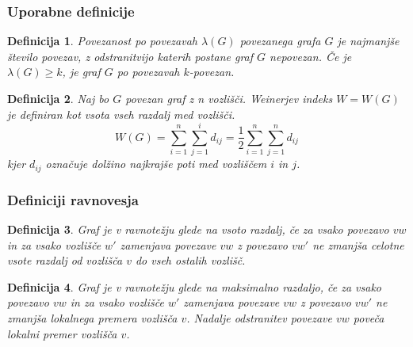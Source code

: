 \documentclass[12pt, hyperref={unicode}]{beamer}
\newtheorem{definicija}{Definicija}
\begin{document}
\begin{frame}
   
    \frametitle{Uporabne definicije}
    \begin{definicija}
    Povezanost po povezavah $\lambda(G)$ povezanega grafa $G$ je najmanjše število povezav,
    z odstranitvijo katerih postane graf $G$ nepovezan. Če je $\lambda(G) \geq k$,
    je graf $G$ po povezavah $k$-povezan.
    \end{definicija}

    \begin{definicija}
    Naj bo $G$ povezan graf z n vozlišči. Weinerjev indeks $W = W(G)$ je definiran
    kot vsota vseh razdalj med vozlišči.
    $$W(G) = \sum_{i=1}^{n} \sum_{j=1}^{i} d_{ij} = \frac{1}{2} \sum_{i=1}^{n} \sum_{j=1}^{n} d_{ij}$$
    kjer $d_{ij}$ označuje dolžino najkrajše poti med vozliščem $i$ in $j$.
    \end{definicija}

\end{frame}

\begin{frame}
   
    \frametitle{Definiciji ravnovesja}
    \begin{definicija}
    Graf je v \textit{ravnotežju glede na vsoto razdalj}, če za vsako povezavo $vw$ in
    za vsako vozlišče $w'$ zamenjava povezave $vw$ z povezavo $vw'$ ne zmanjša
    celotne vsote razdalj od vozlišča $v$ do vseh ostalih vozlišč.
    \end{definicija}
        
    \begin{definicija}
    Graf je v \textit{ravnotežju glede na maksimalno razdaljo}, če za vsako povezavo $vw$
    in za vsako vozlišče $w'$ zamenjava povezave $vw$ z povezavo $vw'$ ne zmanjša
    lokalnega premera vozlišča $v$. Nadalje odstranitev povezave $vw$ poveča
    lokalni premer vozlišča $v$.
    \end{definicija}

\end{frame}
\end{document}
